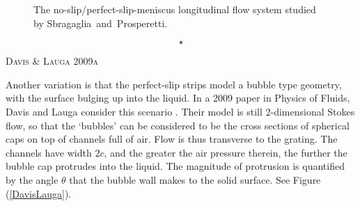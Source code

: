 \documentclass[12pt, a4paper, twoside, openright]{book}
\newcommand{\sep}{\begin{equation*} \star \end{equation*}}
\newcommand{\paper}[1]
         {\colorbox[gray]{0.8}{ \textsc{#1}}
         
         }
\begin{document}
\begin{figure}[ht]
\centering
{}
\caption{The no-slip/perfect-slip-meniscus longitudinal flow system \mbox{studied} by Sbragaglia~and~Prosperetti.} \label{SbragProsp}
\end{figure}

\sep


\paper{Davis \& Lauga 2009a}
Another variation is that the perfect-slip strips model a bubble type geometry, with the surface bulging up into the liquid.  In a 2009 paper in Physics of Fluids, Davis and Lauga consider this scenario \cite{DavisLauga2009a}.  Their model is still 2-dimensional Stokes flow, so that the `bubbles' can be considered to be the cross sections of spherical caps on top of channels full of air. Flow is thus transverse to the grating.  The channels have width $2c$, and the greater the air pressure therein, the further the bubble cap protrudes into the liquid.  The magnitude of protrusion is quantified by the angle $\theta$ that the bubble wall makes to the solid surface.
See Figure (\ref{DavisLauga}).
\end{document}

